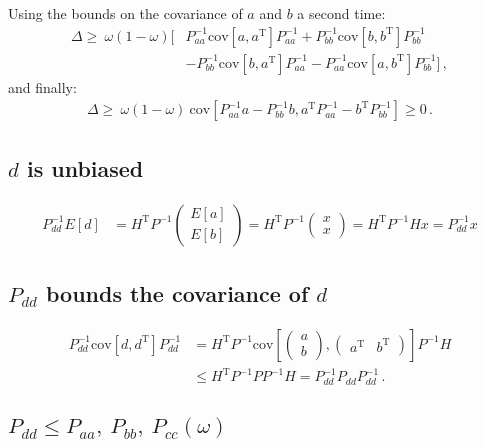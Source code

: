 \documentclass[11pt]{article}
\newcommand{\cov}{\mathrm{cov}}
\newcommand{\transpose}{\mathrm{\scriptscriptstyle T}}
\begin{document}
Using the bounds on the covariance of $a$ and $b$ a second time:
\begin{align}
\Delta \ge\ \omega(1-\omega) \Big[&
    P_{aa}^{-1}\cov[a, a^\transpose]P_{aa}^{-1} + P_{bb}^{-1}\cov[b, b^\transpose] P_{bb}^{-1} \\
&- P_{bb}^{-1}\cov[b, a^\transpose] P_{aa}^{-1}- P_{aa}^{-1}\cov[a, b^\transpose] P_{bb}^{-1} \Big]\,,
\end{align}
and finally:
\begin{align}
\Delta \ge\ \omega(1-\omega)\ \cov\left[
P_{aa}^{-1}a - P_{bb}^{-1}b, a^\transpose P_{aa}^{-1} - b^\transpose P_{bb}^{-1}\right] \geq 0\,.
\end{align}


\subsection{$d$ is unbiased}
\label{proof_d_is_unbiased}

\begin{align}
    P_{dd}^{-1}E[d] &= H^\transpose P^{-1} \begin{pmatrix}E[a]\\E[b]\end{pmatrix}
    =H^\transpose P^{-1} \begin{pmatrix}x\\x\end{pmatrix}
    =H^\transpose P^{-1} H x  = P_{dd}^{-1} x 
\end{align}

\subsection{$P_{dd}$ bounds the covariance of $d$}
\label{proof_pdd_bounds_covariance}
\begin{align}
    P_{dd}^{-1} \cov[d, d^{\transpose}] P_{dd}^{-1} & =
    H^{\transpose} P^{-1} \cov\left[\begin{pmatrix}a\\b\end{pmatrix}, 
    \begin{pmatrix}a^\transpose & b^\transpose\end{pmatrix}\right]P^{-1}H \\
    &\le H^{\transpose} P^{-1} PP^{-1}H = P_{dd}^{-1} P_{dd} P_{dd}^{-1}\,.
\end{align}

\subsection{$P_{dd}\le P_{aa},\ P_{bb},\ P_{cc}(\omega)$}
\label{proof_pdd_is_smaller_than_paa}
\end{document}
